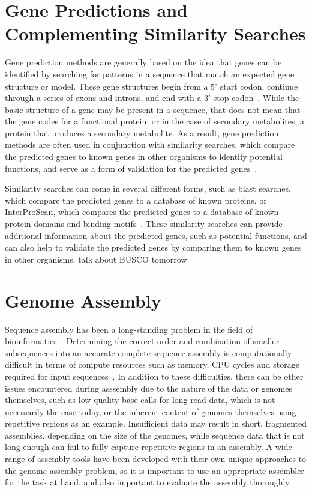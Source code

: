 \section{Gene Predictions and Complementing Similarity Searches}

Gene prediction methods are generally based on the idea that genes can be
identified by searching for patterns in a sequence that match an expected gene structure or model. These gene structures begin from a 5' start codon, continue through a series of exons and introns, and end with a 3' stop codon~\cite{loftus2003a}. While the basic structure of a gene may be present in a sequence, that does not mean that the gene codes for a functional protein, or in the case of secondary metabolites, a protein that produces a secondary metabolite. As a result, gene prediction methods are often used in conjunction with similarity searches, which compare the predicted genes to known genes in other organisms to identify potential functions, and serve as a form of validation for the predicted genes~\cite{loftus2003a}. 

Similarity searches can come in several different forms, such as blast searches, which compare the predicted genes to a database of known proteins, or InterProScan, which compares the predicted genes to a database of known protein domains and binding motifs~\cite{loftus2003a}. These similarity searches can provide additional information about the predicted genes, such as potential functions, and can also help to validate the predicted genes by comparing them to known genes in other organisms. talk about BUSCO tomorrow  

\section{Genome Assembly}

Sequence assembly has been a long-standing problem in the field of
bioinformatics~\cite{nagarajan2013a}. Determining the correct order and
combination of smaller subsequences into an accurate complete sequence
assembly is computationally difficult in terms of compute resources
such as memory, CPU cycles and storage required for input
sequences~\cite{nagarajan2013a}. In addition to these difficulties,
there can be other issues encountered during asssembly due to the
nature of the data or genomes themselves, such as low quality base
calls for long read data, which is not necessarily the case today, or
the inherent content of genomes themselves using repetitive regions as
an example. Insufficient data may result in short, fragmented
assemblies, depending on the size of the genomes, while sequence data
that is not long enough can fail to fully capture repetitive regions
in an assembly. A wide range of assembly tools have been developed
with their own unique approaches to the genome assembly problem, so it
is important to use an appropriate assembler for the task at hand, and
also important to evaluate the assembly thoroughly.

